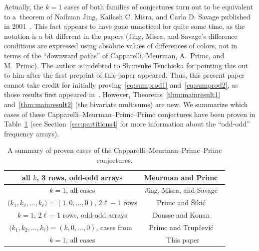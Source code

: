 \documentclass[pdftex]{sigma}
\numberwithin{equation}{section}
\theoremstyle{definition}
\begin{document}
Actually, the $k=1$ cases of both families of conjectures turn out to be equivalent to a~theorem of Naihuan Jing, Kailash C. Misra, and Carla D. Savage published in 2001~\cite{JMS}. This fact appears to have gone unnoticed for quite some time, as the notation is a bit different in the papers (Jing, Misra, and Savage's difference conditions are expressed using absolute values of differences of colors, not in terms of the ``downward paths'' of Capparelli, Meurman, A.~Primc, and M.~Primc). The author is indebted to Shunsuke Tsuchioka for pointing this out to him after the first preprint of this paper appeared. Thus, this present paper cannot take credit for initially proving~\eqref{eq:sumprod1} and~\eqref{eq:sumprod2}, as those results first appeared in~\cite{JMS}. However, Theorems~\ref{thm:mainresult1} and~\ref{thm:mainresult2} (the bivariate multisums) are new. We summarize which cases of these Capparelli--Meurman--Primc--Primc conjectures have been proven in Table~\ref{table} (see Section~\ref{sec:partitions4} for more information about the ``odd-odd'' frequency arrays).

\begin{table}[ht] \label{table}
 \centering\small\renewcommand{\arraystretch}{1.2}
 \begin{tabular}{|c|c|} \hline
all $k$, 3 rows, odd-odd arrays & Meurman and Primc~\cite{MP} \\ \hline
$k=1$, all cases & Jing, Misra, and Savage~\cite{JMS} \\ \hline
$\bigl(k_1,k_2,\dots,k_\ell\bigr)=(1, 0,\dots , 0)$, $2\ell-1$ rows&Primc and \v{S}iki\'{c}~\cite{PS2} \\ \hline
$k=1$, $2\ell-1$ rows, odd-odd arrays & Dousse and Konan~\cite{DouKon} \\ \hline
$\bigl(k_1,k_2,\dots,k_\ell\bigr)=(k, 0,\dots , 0)$, cases from~\cite{CMPP}&Primc and Trup\v{c}evi\'{c}~\cite{PT} \\\hline
$k=1$, all cases & This paper \\\hline
 \end{tabular}
 \caption{A summary of proven cases of the Capparelli--Meurman--Primc--Primc conjectures.}
\end{table}
\end{document}
